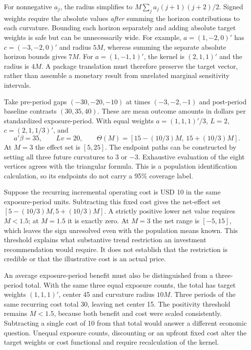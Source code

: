 For nonnegative $a_j$, the radius simplifies to
$M\sum_j a_j(j+1)(j+2)/2$. Signed weights require the absolute values
\emph{after} summing the horizon contributions to each curvature. Bounding
each horizon separately and adding absolute target weights is safe but can
be unnecessarily wide. For example, $a=(1,-2,0)'$ has
$c=(-3,-2,0)'$ and radius $5M$, whereas summing the separate absolute
horizon bounds gives $7M$. For $a=(1,-1,1)'$, the kernel is
$(2,1,1)'$ and the radius is $4M$. A package translation must therefore
preserve the target vector, rather than assemble a monetary result from
unrelated marginal sensitivity intervals.

Take pre-period gaps $(-30,-20,-10)$ at times $(-3,-2,-1)$ and
post-period baseline contrasts $(30,35,40)$. These are mean outcome
amounts in dollars per standardized exposure-period. With equal weights
$a=(1,1,1)'/3$, $L=2$, $c=(2,1,1/3)'$, and
\begin{equation}
 a'\beta=35,\qquad Lv=20,\qquad
 \Theta(M)=[15-(10/3)M,\ 15+(10/3)M].
 \label{exec17:s6-money-sensitivity}
\end{equation}
At $M=3$ the effect set is $[5,25]$. The endpoint paths can be
constructed by setting all three future curvatures to $3$ or $-3$.
Exhaustive evaluation of the eight vertices agrees with the triangular
formula. This is a population identification calculation, so its endpoints
do not carry a 95\% coverage label.~\citep{exec17_s6_math}

Suppose the recurring incremental operating cost is USD 10 in the same
exposure-period units. Subtracting this fixed cost gives the net-effect set
$[5-(10/3)M,5+(10/3)M]$. A strictly positive lower net value requires
$M<1.5$; at $M=1.5$ it is exactly zero. At $M=3$ the net range is
$[-5,15]$, which leaves the sign unresolved even with the population means
known. This threshold explains what substantive trend restriction an
investment recommendation would require. It does not establish that the
restriction is credible or that the illustrative cost is an actual price.

An average exposure-period benefit must also be distinguished from a
three-period total. With the same three equal exposure counts, the total
has target weights $(1,1,1)'$, center 45 and curvature radius $10M$.
Three periods of the same recurring cost total 30, leaving net center 15.
The positivity threshold remains $M<1.5$, because both benefit and cost
were scaled consistently. Subtracting a single cost of 10 from that total
would answer a different economic question. Unequal exposure counts,
discounting or an upfront fixed cost alter the target weights or cost
functional and require recalculation of the kernel.


